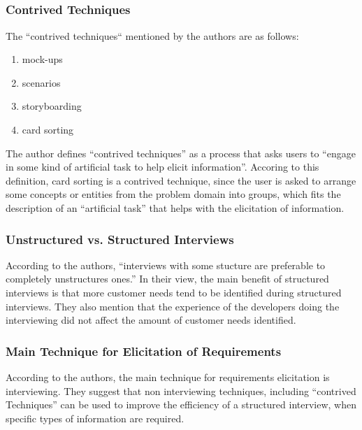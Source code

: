 \documentclass[letterpaper,12pt]{article}
\begin{document}
\subsection{}

\subsubsection{Contrived Techniques}
The ``contrived techniques`` mentioned by the authors are as follows:
\begin{enumerate}
 \item mock-ups
 \item scenarios
 \item storyboarding
 \item card sorting
\end{enumerate}
The author defines ``contrived techniques'' as a process that asks users to
``engage in some kind of artificial task to help elicit information''. Accoring
to this definition, card sorting is a contrived technique, since the user is
asked to arrange some concepts or entities from the problem domain into groups,
which fits the description of an ``artificial task'' that helps with the
elicitation of information.

\subsubsection{Unstructured vs. Structured Interviews}

According to the authors, ``interviews with some stucture are preferable to
completely unstructures ones.'' In their view, the main benefit of  structured
interviews is that more customer needs tend to be identified during structured
interviews. They also mention that the experience of the developers doing the
interviewing did not affect the amount of customer needs identified.


\subsubsection{Main Technique for Elicitation of Requirements}

According to the authors, the main technique for requirements elicitation is
interviewing. They suggest that non interviewing techniques, including
``contrived Techniques'' can be used to improve the efficiency of
a structured interview, when specific types of information are
required.
\end{document}
